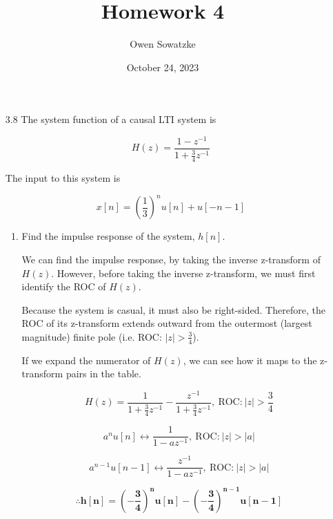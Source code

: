 \documentclass[fleqn]{article}
\title{Homework 4}
\author{Owen Sowatzke}
\date{October 24, 2023}
\makeatletter
\newcommand{\zerodisplayskip}{
	\setlength{\abovedisplayskip}{0pt}%
	\setlength{\belowdisplayskip}{0pt}%
	\setlength{\abovedisplayshortskip}{0pt}%
	\setlength{\belowdisplayshortskip}{0pt}%
	\setlength{\mathindent}{0pt}}
\newenvironment{equationCenter}{\@fleqnfalse\begin{equation*}}{\end{equation*}}
\makeatother
\begin{document}
	\offinterlineskip
	\setlength{\lineskip}{12pt}
	\zerodisplayskip
	\maketitle
	\begin{enumerate}[nolistsep]
		\item[3.8] The system function of a causal LTI system is
	
		\begin{equationCenter}
			H(z) = \frac{1 - z^{-1}}{1 + \frac{3}{4}z^{-1}}
		\end{equationCenter}
		
		The input to this system is
		
		\begin{equationCenter}
			x[n] = \left(\frac{1}{3}\right)^nu[n] + u[-n-1]
		\end{equationCenter}
		
		\begin{enumerate}[nolistsep]
			\item Find the impulse response of the system, $h[n]$.
			
			We can find the impulse response, by taking the inverse z-transform of $H(z)$. However, before taking the inverse z-transform, we must first identify the ROC of $H(z)$.
			
			Because the system is casual, it must also be right-sided. Therefore, the ROC of its z-transform extends outward from
the outermost (largest magnitude) finite pole (i.e. ROC: $|z| > \frac{3}{4}$).

			If we expand the numerator of $H(z)$, we can see how it maps to the z-transform pairs in the table.
			
			\begin{equation*}
				H(z) = \frac{1}{1 + \frac{3}{4}z^{-1}} - \frac{z^{-1}}{1 + \frac{3}{4}z^{-1}},\ \text{ROC:}\ |z| > \frac{3}{4}
			\end{equation*}
			
			\begin{equation*}
				a^nu[n] \leftrightarrow \frac{1}{1 - az^{-1}},\ \text{ROC:}\ |z| > |a| 
			\end{equation*}
			
			\begin{equation*}
				a^{n-1}u[n-1] \leftrightarrow \frac{z^{-1}}{1 - az^{-1}},\ \text{ROC:}\ |z| > |a| 
			\end{equation*}
			
			\begin{equation*}
				\mathbf{\therefore h[n] = \left(-\frac{3}{4}\right)^nu[n] - \left(-\frac{3}{4}\right)^{n-1}u[n-1]}
			\end{equation*}
			

\end{enumerate}
\end{enumerate}
\end{document}
